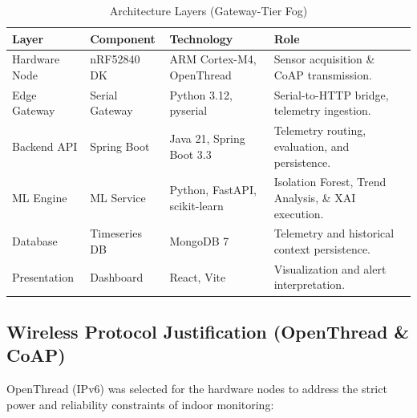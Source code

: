 \documentclass[10pt,a4paper]{article}
\begin{document}
\begin{table}[htbp]
\centering
\setlength{\tabcolsep}{4pt}
\renewcommand{\arraystretch}{1.0}
\caption{Architecture Layers (Gateway-Tier Fog)}
\label{tab:arch}
\small
\begin{tabularx}{\textwidth}{@{} >{\raggedright\arraybackslash}p{2.2cm} >{\raggedright\arraybackslash}p{2.5cm} >{\raggedright\arraybackslash}p{3.5cm} >{\raggedright\arraybackslash}X @{}}
\toprule
\textbf{Layer} & \textbf{Component} & \textbf{Technology} & \textbf{Role} \\
\midrule
Hardware Node  & nRF52840 DK        & ARM Cortex-M4, OpenThread     & Sensor acquisition \& CoAP transmission. \\
\midrule
Edge Gateway   & Serial Gateway     & Python 3.12, pyserial         & Serial-to-HTTP bridge, telemetry ingestion. \\
\midrule
Backend API    & Spring Boot        & Java 21, Spring Boot 3.3      & Telemetry routing, evaluation, and persistence. \\
\midrule
ML Engine      & ML Service         & Python, FastAPI, scikit-learn & Isolation Forest, Trend Analysis, \& XAI execution. \\
\midrule
Database       & Timeseries DB      & MongoDB 7                     & Telemetry and historical context persistence. \\
\midrule
Presentation   & Dashboard          & React, Vite                   & Visualization and alert interpretation. \\
\bottomrule
\end{tabularx}
\end{table}

\subsection{Wireless Protocol Justification (OpenThread \& CoAP)}

OpenThread (IPv6) was selected for the hardware nodes to address the strict power and
reliability constraints of indoor monitoring:
\end{document}
